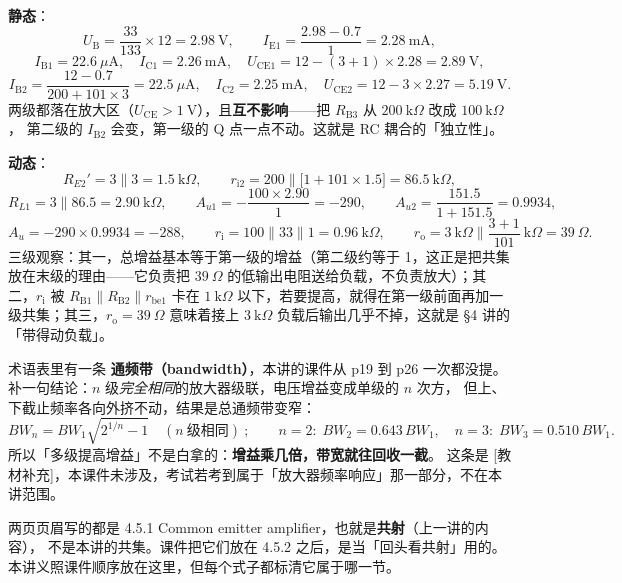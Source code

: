 \documentclass[11pt]{ctexart}
\begin{document}
\textbf{静态}：
\[
U_{\mathrm{B}}=\frac{33}{133}\times12=2.98\ \mathrm{V},\qquad
I_{\mathrm{E1}}=\frac{2.98-0.7}{1}=2.28\ \mathrm{mA},
\]
\[
I_{\mathrm{B1}}=22.6\ \mu\mathrm{A},\quad I_{\mathrm{C1}}=2.26\ \mathrm{mA},\quad
U_{\mathrm{CE1}}=12-(3+1)\times2.28=2.89\ \mathrm{V},
\]
\[
I_{\mathrm{B2}}=\frac{12-0.7}{200+101\times3}=22.5\ \mu\mathrm{A},\quad
I_{\mathrm{C2}}=2.25\ \mathrm{mA},\quad U_{\mathrm{CE2}}=12-3\times2.27=5.19\ \mathrm{V}.
\]
两级都落在放大区（$U_{\mathrm{CE}}>1\ \mathrm{V}$），且\textbf{互不影响}——把 $R_{\mathrm{B3}}$ 从 $200\ \mathrm{k}\Omega$ 改成 $100\ \mathrm{k}\Omega$，
第二级的 $I_{\mathrm{B2}}$ 会变，第一级的 Q 点一点不动。这就是 RC 耦合的「独立性」。

\textbf{动态}：
\[
R_{E2}'=3\parallel3=1.5\ \mathrm{k}\Omega,\qquad
r_{\mathrm{i}2}=200\parallel\bigl[1+101\times1.5\bigr]=86.5\ \mathrm{k}\Omega,
\]
\[
R_{L1}=3\parallel86.5=2.90\ \mathrm{k}\Omega,\qquad
A_{u1}=-\frac{100\times2.90}{1}=-290,\qquad
A_{u2}=\frac{151.5}{1+151.5}=0.9934,
\]
\[
A_u=-290\times0.9934=-288,\qquad
r_{\mathrm{i}}=100\parallel33\parallel1=0.96\ \mathrm{k}\Omega,\qquad
r_{\mathrm{o}}=3\ \mathrm{k}\Omega\parallel\frac{3+1}{101}\ \mathrm{k}\Omega=39\ \Omega .
\]
三级观察：其一，总增益基本等于第一级的增益（第二级约等于 1，这正是把共集放在末级的理由——它负责把
$39\ \Omega$ 的低输出电阻送给负载，不负责放大）；其二，$r_{\mathrm{i}}$ 被 $R_{\mathrm{B1}}\parallel R_{\mathrm{B2}}\parallel r_{\mathrm{be1}}$
卡在 $1\ \mathrm{k}\Omega$ 以下，若要提高，就得在第一级前面再加一级共集；其三，$r_{\mathrm{o}}=39\ \Omega$
意味着接上 $3\ \mathrm{k}\Omega$ 负载后输出几乎不掉，这就是 §4 讲的「带得动负载」。


术语表里有一条 \textbf{通频带（bandwidth）}，本讲的课件从 p19 到 p26 一次都没提。
补一句结论：$n$ 级\emph{完全相同}的放大器级联，电压增益变成单级的 $n$ 次方，
但上、下截止频率各向外挤不动，结果是总通频带变窄：
\[
BW_n=BW_1\sqrt{2^{1/n}-1}\quad(n\ \text{级相同})\ ;\qquad
n=2:\;BW_2=0.643\,BW_1,\quad n=3:\;BW_3=0.510\,BW_1 .
\]
所以「多级提高增益」不是白拿的：\textbf{增益乘几倍，带宽就往回收一截}。
这条是 [教材补充]，本课件未涉及，考试若考到属于「放大器频率响应」那一部分，不在本讲范围。



两页页眉写的都是 4.5.1 Common emitter amplifier，也就是\textbf{共射}（上一讲的内容），
不是本讲的共集。课件把它们放在 4.5.2 之后，是当「回头看共射」用的。
本讲义照课件顺序放在这里，但每个式子都标清它属于哪一节。
\end{document}
